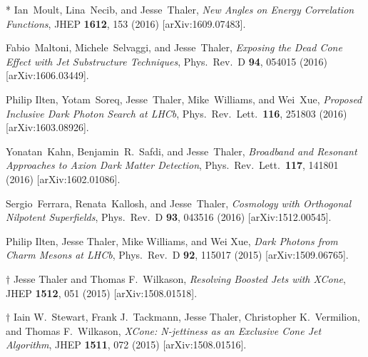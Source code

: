 \documentclass[11pt]{article}
\renewcommand{\bibitem}[1]{\item}
\begin{document}
\begin{list}{[]\addtocounter{jessecount}{-1}}{\leftmargin=3em \itemsep=4pt}
\bibitem{Moult:2016cvt} 
  * Ian~Moult, Lina~Necib, and Jesse~Thaler,
  \emph{New Angles on Energy Correlation Functions},
  JHEP {\bf 1612}, 153 (2016)
  [arXiv:1609.07483].

\bibitem{Maltoni:2016ays} 
  Fabio~Maltoni, Michele~Selvaggi, and Jesse~Thaler,
  \emph{Exposing the Dead Cone Effect with Jet Substructure Techniques},
  Phys.\ Rev.\ D {\bf 94}, 054015 (2016)
  [arXiv:1606.03449].

\bibitem{Ilten:2016tkc} 
  Philip Ilten, Yotam~Soreq, Jesse~Thaler, Mike~Williams, and Wei~Xue,
  \emph{Proposed Inclusive Dark Photon Search at LHCb},
  Phys.\ Rev.\ Lett.\  {\bf 116}, 251803 (2016)
  [arXiv:1603.08926].

\bibitem{Kahn:2016aff} 
  Yonatan~Kahn, Benjamin~R.~Safdi, and Jesse~Thaler,
  \emph{Broadband and Resonant Approaches to Axion Dark Matter Detection},
  Phys.\ Rev.\ Lett.\  {\bf 117}, 141801 (2016)
  [arXiv:1602.01086].

\bibitem{Ferrara:2015tyn} 
  Sergio~Ferrara, Renata~Kallosh, and Jesse~Thaler,
  \emph{Cosmology with Orthogonal Nilpotent Superfields},
  Phys.\ Rev.\ D {\bf 93}, 043516 (2016)
  [arXiv:1512.00545].
  
  
\bibitem{Ilten:2015hya} 
  Philip Ilten, Jesse Thaler, Mike Williams, and Wei Xue,
  \emph{Dark Photons from Charm Mesons at LHCb},
  Phys.\ Rev.\ D {\bf 92}, 115017 (2015)
  [arXiv:1509.06765].
  
  
\bibitem{Thaler:2015xaa} 
  $\dagger$ Jesse Thaler and Thomas F.\ Wilkason,
  \emph{Resolving Boosted Jets with XCone},
  JHEP {\bf 1512}, 051 (2015)
  [arXiv:1508.01518].
  
  
\bibitem{Stewart:2015waa} 
  $\dagger$ Iain W.\ Stewart, Frank J.\ Tackmann, Jesse Thaler, Christopher K.\ Vermilion, and Thomas F.\ Wilkason,
  \emph{XCone: N-jettiness as an Exclusive Cone Jet Algorithm},
  JHEP {\bf 1511}, 072 (2015)
  [arXiv:1508.01516].
   

\end{list}
\end{document}
